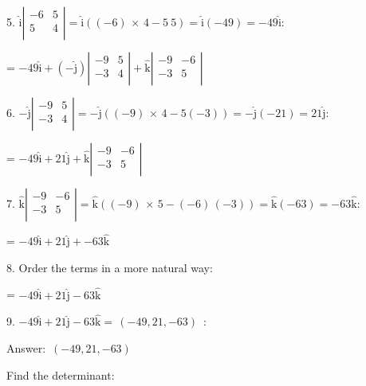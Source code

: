 \documentclass{article}
\begin{document}
5. $\hat{\text{i}} \left| 
\begin{array}{cc}
-6 & 5 \\
 5 & 4 \\
\end{array}
\right| =\hat{\text{i}} ((-6)\, \times \, 4-5\ 5)=\hat{\text{i}} (-49)=-49 \hat{\text{i}}$:

= $-49 \hat{\text{i}}+\left(-\hat{\text{j}}\right) \left| 
\begin{array}{cc}
-9 & 5 \\
 -3 & 4 \\
\end{array}
\right| +\hat{\text{k}} \left| 
\begin{array}{cc}
-9 & -6 \\
 -3 & 5 \\
\end{array}
\right|$

6. $-\hat{\text{j}} \left| 
\begin{array}{cc}
-9 & 5 \\
 -3 & 4 \\
\end{array}
\right| =-\hat{\text{j}} ((-9)\, \times \, 4-5 (-3))=-\hat{\text{j}} (-21)=21 \hat{\text{j}}$:

= $-49 \hat{\text{i}}+21 \hat{\text{j}}+\hat{\text{k}} \left| 
\begin{array}{cc}
-9 & -6 \\
 -3 & 5 \\
\end{array}
\right|$

7. $\hat{\text{k}} \left| 
\begin{array}{cc}
-9 & -6 \\
 -3 & 5 \\
\end{array}
\right| =\hat{\text{k}} ((-9)\, \times \, 5-(-6)\, (-3))=\hat{\text{k}} (-63)=-63 \hat{\text{k}}$:

= $-49 \hat{\text{i}}+21 \hat{\text{j}}+-63 \hat{\text{k}}$

8. Order the terms in a more natural way:

= $-49 \hat{\text{i}}+21 \hat{\text{j}}-63 \hat{\text{k}}$

9. $-49 \hat{\text{i}}+21 \hat{\text{j}}-63 \hat{\text{k}}=\, (-49,21,-63)\,$ :

Answer: $\, (-49,21,-63)\,$

\pagebreak

Find the determinant:
\end{document}
